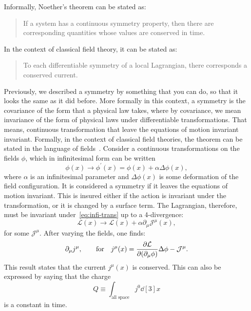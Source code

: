 Informally, Noether's theorem can be stated as:
\begin{quote}
If a system has a continuous symmetry property, then there are corresponding quantities whose values are conserved in time.
\end{quote}
In the context of classical field theory, it can be stated as:
\begin{quote}
To each differentiable symmetry of a local Lagrangian, there corresponds a conserved current.
\end{quote}
Previously, we described a symmetry by something that you can do, so that it looks the same as it did before. More formally in this context, a symmetry is the covariance of the form that a physical law takes, where by covariance, we mean invariance of the form of physical laws under differentiable transformations. That means, continuous transformation that leave the equations of motion invariant invariant. Formally, in the context of classical field theories, the theorem can be stated in the language of fields~\cite{Peskin2019-bt}. Consider a continuous transformations on the fields $\phi$, which in infinitesimal form can be written
\begin{equation}
\phi(x)\rightarrow\phi^\prime(x)=\phi(x)+\alpha\Delta\phi(x),
\label{eq:infi-trans}
\end{equation}  
where $\alpha$ is an infinitesimal parameter and $\Delta\phi(x)$ is some deformation of the field configuration. It is considered a symmetry if it leaves the equations of motion invariant. This is insured either if the action is invariant under the transformation, or it is changed by a surface term. The Lagrangian, therefore, must be invariant under~\ref{eq:infi-trans} up to a 4-divergence:
\begin{equation}
\mathcal{L}(x)\rightarrow\mathcal{L}(x)+\alpha\partial_{\mu}\mathcal{J}^{\mu}(x),
\end{equation}
for some $\mathcal{J}^{\mu}$. After varying the fields, one finds:
\begin{equation}
\partial_{\mu}j^{\mu},\qquad \textrm{for} \quad j^{\mu}(x)=\pdv{\mathcal{L}}{\qty(\partial_{\mu}\phi)}\Delta\phi-\mathcal{J}^{\mu}.
\end{equation}
This result states that the current $j^{\mu}(x)$ is conserved. This can also be expressed by saying that the charge
\begin{equation}
Q\equiv\int_{\textrm{all space}}j^0\dd[3]{x}
\end{equation}
is a constant in time.

